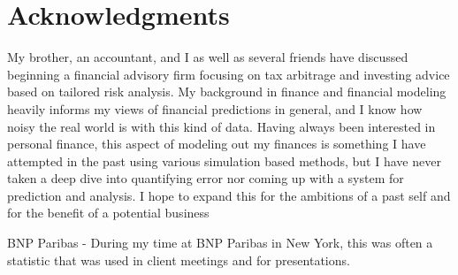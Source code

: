 \documentclass[11pt,a4paper]{article}
\begin{document}
\section*{Acknowledgments}

My brother, an accountant, and I as well as several friends have discussed beginning a financial advisory firm focusing on tax arbitrage and investing advice based on tailored risk analysis. My background in finance and financial modeling heavily informs my views of financial predictions in general, and I know how noisy the real world is with this kind of data. Having always been interested in personal finance, this aspect of modeling out my finances is something I have attempted in the past using various simulation based methods, but I have never taken a deep dive into quantifying error nor coming up with a system for prediction and analysis. I hope to expand this for the ambitions of a past self and for the benefit of a potential business


%
%



\begin{thebibliography}{9}
	BNP Paribas - During my time at BNP Paribas in New York, this was often a statistic that was used in client meetings and for presentations. 
	
	
	
\end{thebibliography}


%
\end{document}
